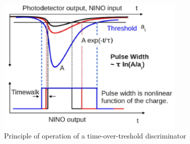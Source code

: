 \begin{figure}[htbp]
\begin{center}
\includegraphics[width=9cm]{../Pictures/Chapter_3/TOT.pdf}
\end{center}
\caption[Time-over-threshold]{Principle of operation of a time-over-treshold discriminator}
\label{fig:tot}
\end{figure}


